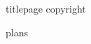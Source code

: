 \documentclass[11pt,oneside]{book}
\begin{document}
     
\frontmatter                            %
{titlepage}
{copyright}
% 
% 
\tableofcontents                        %
\listoffigures
\listoftables

\mainmatter                             %

 \pagestyle{fancy}
 \pagestyle{fancy}
\fancyhf{}
\fancyhead[LE,RO]{\thepage}
\fancyhead[RE,LO]{\leftmark}

{plans}



% 
% 

% 
\end{document}
